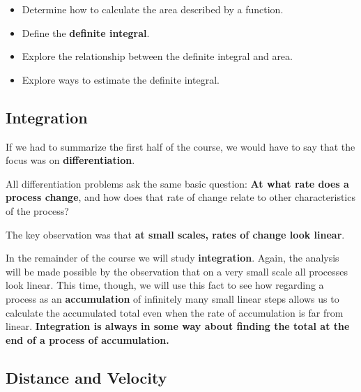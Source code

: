 



\setfont
\pagestyle{fancy}
\renewcommand{\Week}{7 }
\renewcommand{\WeekTitle}{\WeekTitleSeven }

\fancyhead[LE,RO]{Week \Week}  %
\fancyfoot{}
\sectionbox{Week \#\Week: \WeekTitle}

\vspace{5mm}
\noindent

\goals
\begin{itemize}
\item Determine how to calculate the area described by a function.
\item Define the {\bf definite integral}.
\item Explore the relationship between the definite integral and area.
\item Explore ways to estimate the definite integral.
\end{itemize}

\newpage

\subsection*{Integration} 
If we had to summarize the first half of
the course, we would have to say that the focus was on {\bf
  differentiation}. 

All differentiation problems ask the same basic question: {\bf At what
  rate does a process change}, and how does that rate of change relate
to other characteristics of the process?

The key observation was that {\bf at small scales, rates of change look linear}.

\newpage

In the remainder of the course we will study {\bf integration}.
Again, the analysis will be made possible by the observation that on a very
small scale all processes look linear.  This time, though, we will use
this fact to see how regarding a process as an {\bf accumulation} of
infinitely many small linear steps allows us to calculate the
accumulated total even when the rate of accumulation is far from
linear.  {\bf Integration is always in some way about finding the
  total at the end of a process of accumulation.}

\newpage


 \subsection*{Distance and Velocity}

